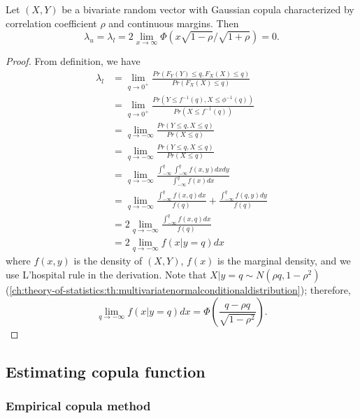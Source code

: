 \begin{refsection}
\begin{lemma}
Let $(X,Y)$ be a bivariate random vector with Gaussian copula characterized by correlation coefficient $\rho$ and continuous margins.	Then
	$$\lambda_u=\lambda_l = 2\lim_{x\to \infty} \Phi(x\sqrt{1-\rho}/\sqrt{1+\rho}) = 0.$$
\end{lemma}
\begin{proof}
From definition, we have
\begin{align*}
\lambda_l &= \lim_{q\to 0^+} \frac{ Pr(F_Y(Y) \leq q , F_X(X) \leq q)}{Pr(F_X(X) \leq q)} \\
&=\lim_{q\to 0^+} \frac{ Pr(Y \leq f^{-1}(q) , X \leq \phi^{-1}(q))}{Pr(X \leq f^{-1}(q))} \\
&=\lim_{q\to -\infty} \frac{ Pr(Y \leq q , X \leq q)}{Pr(X \leq q)} \\
&=\lim_{q\to -\infty} \frac{ Pr(Y \leq q , X \leq q)}{Pr(X \leq q)} \\
&= \lim_{q\to -\infty} \frac{ \int_{-\infty}^{q}\int_{-\infty}^{q} f(x,y)dxdy}{\int_{-\infty}^{q} f(x)dx} \\
&=\lim_{q\to -\infty} \frac{ \int_{-\infty}^{q}f(x,q)dx}{ f(q)} + \frac{ \int_{-\infty}^{q}f(q,y)dy}{ f(q)} \\
&=2\lim_{q\to -\infty} \frac{ \int_{-\infty}^{q}f(x,q)dx}{ f(q)} \\
&=2\lim_{q\to -\infty} f(x|y=q)dx
\end{align*}
where $f(x,y)$ is the density of $(X,Y)$, $f(x)$ is the marginal density, and we use L'hospital rule in the derivation.  
Note that $X|y=q \sim N(\rho q, 1-\rho^2)$(\autoref{ch:theory-of-statistics:th:multivariatenormalconditionaldistribution}); therefore, 
$$\lim_{q\to -\infty} f(x|y=q)dx = \Phi(\frac{q-\rho q}{\sqrt{1-\rho^2}}).$$
\end{proof}

\subsection{Estimating copula function}
\subsubsection{Empirical copula method}



\end{refsection}
